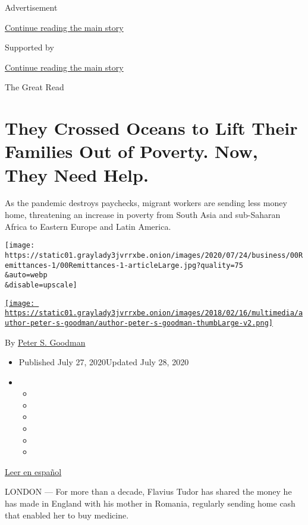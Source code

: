 Advertisement

\protect\hyperlink{after-top}{Continue reading the main story}

Supported by

\protect\hyperlink{after-sponsor}{Continue reading the main story}

The Great Read

\hypertarget{they-crossed-oceans-to-lift-their-families-out-of-poverty-now-they-need-help}{%
\section{They Crossed Oceans to Lift Their Families Out of Poverty. Now,
They Need
Help.}\label{they-crossed-oceans-to-lift-their-families-out-of-poverty-now-they-need-help}}

As the pandemic destroys paychecks, migrant workers are sending less
money home, threatening an increase in poverty from South Asia and
sub-Saharan Africa to Eastern Europe and Latin America.

\texttt{[image: https://static01.graylady3jvrrxbe.onion/images/2020/07/24/business/00Remittances-1/00Remittances-1-articleLarge.jpg?quality=75\\\&auto=webp\\\&disable=upscale]}

\href{https://www.nytimes3xbfgragh.onion/by/peter-s-goodman}{\texttt{[image: https://static01.graylady3jvrrxbe.onion/images/2018/02/16/multimedia/author-peter-s-goodman/author-peter-s-goodman-thumbLarge-v2.png]}}

By \href{https://www.nytimes3xbfgragh.onion/by/peter-s-goodman}{Peter S.
Goodman}

\begin{itemize}
\item
  Published July 27, 2020Updated July 28, 2020
\item
  \begin{itemize}
  \item
  \item
  \item
  \item
  \item
  \item
  \end{itemize}
\end{itemize}

\href{https://www.nytimes3xbfgragh.onion/es/2020/07/28/espanol/mundo/remesas-coronavirus.html}{Leer
en español}

LONDON --- For more than a decade, Flavius Tudor has shared the money he
has made in England with his mother in Romania, regularly sending home
cash that enabled her to buy medicine.

